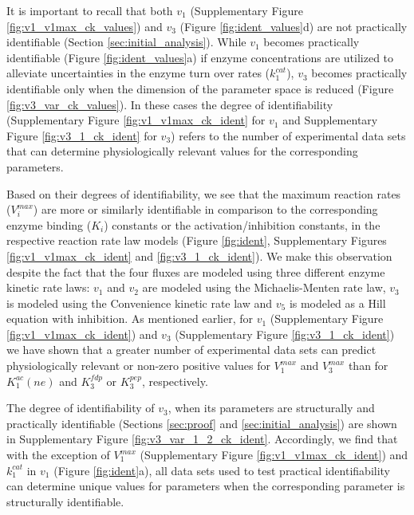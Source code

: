 \documentclass[10pt]{article}
\begin{document}
	It is important to recall that both $v_1$ (Supplementary Figure \ref{fig:v1_v1max_ck_values}) and $v_3$ (Figure \ref{fig:ident_values}d) are not practically identifiable (Section \ref{sec:initial_analysis}). While $v_1$ becomes practically identifiable (Figure \ref{fig:ident_values}a) if enzyme concentrations are utilized to alleviate uncertainties in the enzyme turn over rates ($k_1^{cat}$), $v_3$ becomes practically identifiable only when the dimension of the parameter space is reduced (Figure \ref{fig:v3_var_ck_values}). In these cases the degree of identifiability (Supplementary Figure \ref{fig:v1_v1max_ck_ident} for $v_1$ and Supplementary Figure \ref{fig:v3_1_ck_ident} for $v_3$) refers to the number of experimental data sets that can determine physiologically relevant values for the corresponding parameters.
	
	Based on their degrees of identifiability, we see that the maximum reaction rates ($V_i^{max}$) are more or similarly identifiable in comparison to the corresponding enzyme binding ($K_i$) constants or the activation/inhibition constants, in the respective reaction rate law models (Figure \ref{fig:ident}, Supplementary Figures \ref{fig:v1_v1max_ck_ident} and \ref{fig:v3_1_ck_ident}). We make this observation despite the fact that the four fluxes are modeled using three different enzyme kinetic rate laws: $v_1$ and $v_2$ are modeled using the Michaelis-Menten rate law, $v_3$ is modeled using the Convenience kinetic rate law and $v_5$ is modeled as a Hill equation with inhibition. As mentioned earlier, for $v_1$ (Supplementary Figure \ref{fig:v1_v1max_ck_ident}) and $v_3$ (Supplementary Figure \ref{fig:v3_1_ck_ident}) we have shown that a greater number of experimental data sets can predict physiologically relevant or non-zero positive values for $V_1^{max}$ and $V_3^{max}$ than for $K_1^{ac}(ne)$ and $K_3^{fdp}$ or $K_3^{pep}$, respectively. 	 
	
	The degree of identifiability of $v_3$, when its parameters are structurally and practically identifiable (Sections \ref{sec:proof} and \ref{sec:initial_analysis}) are shown in Supplementary Figure \ref{fig:v3_var_1_2_ck_ident}. Accordingly, we find that with the exception of $V_1^{max}$ (Supplementary Figure \ref{fig:v1_v1max_ck_ident}) and $k_1^{cat}$ in $v_1$ (Figure \ref{fig:ident}a), all data sets used to test practical identifiability can determine unique values for parameters when the corresponding parameter is structurally identifiable. 
	
\end{document}
